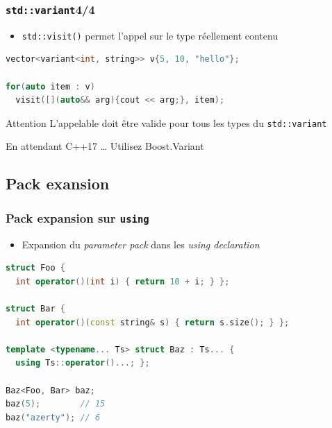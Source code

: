 \documentclass[C++.tex]{subfiles}
\begin{document}
\begin{frame}[fragile]
	\frametitle{\lstinline|std::variant|\titlehfill{}4/4}
	\begin{itemize}
		\item \lstinline|std::visit()| permet l'appel sur le type réellement contenu
	\end{itemize}

	\begin{lstlisting}[language=C++]
vector<variant<int, string>> v{5, 10, "hello"};

for(auto item : v)
  visit([](auto&& arg){cout << arg;}, item);\end{lstlisting}

	\begin{alertblock}{Attention}
		L'appelable doit être valide pour tous les types du \lstinline|std::variant| 

	\end{alertblock}

	\begin{block}{En attendant C++17 \ldots}
		Utilisez Boost.Variant
	\end{block}
\end{frame}

\subsection*{Pack exansion}
\begin{frame}[fragile]
	\frametitle{Pack expansion sur \lstinline|using|}
	\begin{itemize}
		\item Expansion du \textit{parameter pack} dans les \textit{using declaration}
	\end{itemize}

	\begin{lstlisting}[language=C++]
struct Foo {
  int operator()(int i) { return 10 + i; } };

struct Bar {
  int operator()(const string& s) { return s.size(); } };

template <typename... Ts> struct Baz : Ts... {
  using Ts::operator()...; };

Baz<Foo, Bar> baz;
baz(5);        // 15
baz("azerty"); // 6
\end{lstlisting}
\end{frame}
\end{document}

